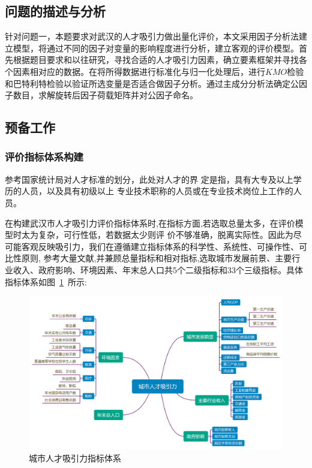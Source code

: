 \documentclass{whutmod}
\begin{document}
	\subsection{问题的描述与分析}
	针对问题一，本题要求对武汉的人才吸引力做出量化评价，本文采用因子分析法建立模型，将通过不同的因子对变量的影响程度进行分析，建立客观的评价模型。首先根据题目要求和以往研究，寻找合适的人才吸引力因素，确立要素框架并寻找各个因素相对应的数据。在将所得数据进行标准化与归一化处理后，进行$KMO$检验和巴特利特检验以验证所选变量是否适合做因子分析。通过主成分分析法确定公因子数目，求解旋转后因子荷载矩阵并对公因子命名。


		\subsection{预备工作}
		\subsubsection{评价指标体系构建}
		参考国家统计局对人才标准的划分，此处对人才的界 定是指，具有大专及以上学历的人员，以及具有初级以上 专业技术职称的人员或在专业技术岗位上工作的人员。
		
		在构建武汉市人才吸引力评价指标体系时,在指标方面,若选取总量太多，在评价模型时太为复杂，可行性低，若数据太少则评 价不够准确，脱离实际性。因此为尽可能客观反映吸引力，我们在遵循建立指标体系的科学性、系统性、可操作性、可比性原则, 参考大量文献,并兼顾总量指标和相对指标,选取城市发展前景、主要行业收入、政府影响、环境因素、年末总人口共5个二级指标和33个三级指标。具体指标体系如图~\ref{lct}~所示: 	
		\begin{figure}[H]
			\centering
			\includegraphics[width=\textwidth]{figures/clt.png}
			\caption{城市人才吸引力指标体系}\label{lct}
		\end{figure}  
		
\end{document}
